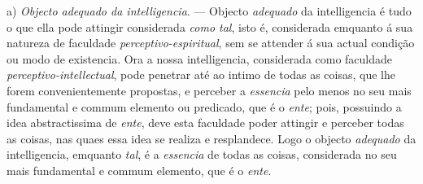 a) \emph{Objecto adequado da intelligencia}. --- Objecto \emph{adequado} da intelligencia é tudo o que ella pode attingir considerada \emph{como tal}, isto é, considerada emquanto á sua natureza de faculdade \emph{perceptivo-espiritual}, sem se attender á sua actual condição ou modo de existencia. Ora a nossa intelligencia,   considerada como faculdade \emph{perceptivo-intellectual}, pode penetrar até ao intimo de todas as coisas, que lhe forem convenientemente propostas, e perceber a \emph{essencia} pelo menos no seu mais fundamental e commum elemento ou predicado, que é o \emph{ente}; pois, possuindo a idea abstractissima de \emph{ente}, deve esta faculdade poder attingir e perceber todas as coisas, nas quaes essa idea se realiza e resplandece. Logo o objecto \emph{adequado} da intelligencia, emquanto \emph{tal}, é a \emph{essencia} de todas as coisas, considerada no seu mais fundamental e commum elemento, que é o \emph{ente}.

